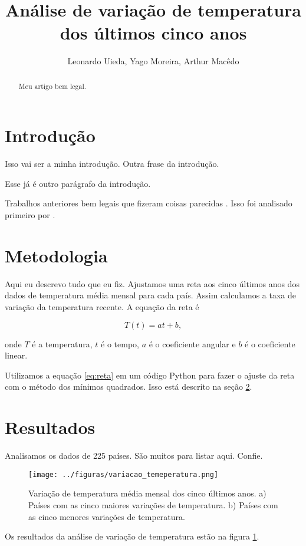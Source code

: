 \documentclass{article}
\begin{document}
\title{Análise de variação de temperatura dos últimos cinco anos}
\author{Leonardo Uieda, Yago Moreira, Arthur Macêdo}

\maketitle

\begin{abstract}
Meu artigo bem legal.
\end{abstract}

\section{Introdução}

Isso vai ser a minha introdução.
Outra frase da introdução.

Esse já é outro parágrafo da introdução.

Trabalhos anteriores bem legais que fizeram coisas parecidas
\citep{Osman2021}.
Isso foi analisado primeiro por \citet{Osman2021}.

\section{Metodologia}
\label{sec:metodos}

Aqui eu descrevo tudo que eu fiz.
Ajustamos uma reta aos cinco últimos anos dos dados de temperatura média mensal para cada país.
Assim calculamos a taxa de variação da temperatura recente.
A equação da reta é

\begin{equation}
T(t) = a t + b,
\label{eq:reta}
\end{equation}

\noindent
onde $T$ é a temperatura, $t$ é o tempo, $a$ é o coeficiente angular e $b$ é o coeficiente linear.

Utilizamos a equação \ref{eq:reta} em um código Python para fazer o ajuste da reta com o método dos mínimos quadrados.
Isso está descrito na seção \ref{sec:metodos}.

\section{Resultados}

Analisamos os dados de 225 países. São muitos para listar aqui. Confie.

\begin{figure}[!h]
	\texttt{[image: ../figuras/variacao\_temeperatura.png]}
	\caption{
		Variação de temperatura média mensal dos cinco últimos anos.
		a) Países com as cinco maiores variações de temperatura.
		b) Países com as cinco menores variações de temperatura.
	}
	\label{fig:variacao}
\end{figure}

Os resultados da análise de variação de temperatura estão na figura \ref{fig:variacao}.



\end{document}
